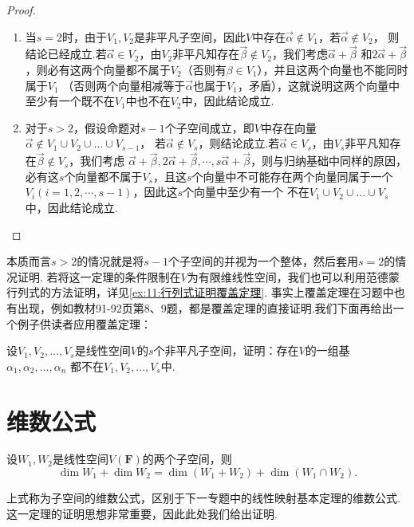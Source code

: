 \begin{proof}
    \begin{enumerate}
        \item 当$s=2$时，由于$V_1,V_2$是非平凡子空间，因此$V$中存在$\vec{\alpha}\notin V_1$，若$\vec{\alpha}\notin V_2$，
        则结论已经成立.若$\vec{\alpha}\in V_2$，由$V_2$非平凡知存在$\vec{\beta}\notin V_2$，我们考虑$\vec{\alpha}+\vec{\beta}$
        和$2\vec{\alpha}+\vec{\beta}$，则必有这两个向量都不属于$V_2$（否则有$\beta\in V_1$），并且这两个向量也不能同时属于$V_1$
        （否则两个向量相减等于$\vec{\alpha}$也属于$V_1$，矛盾），这就说明这两个向量中至少有一个既不在$V_1$中也不在$V_2$中，因此结论成立.
        \item 对于$s>2$，假设命题对$s-1$个子空间成立，即$V$中存在向量$\vec{\alpha}\notin V_1\cup V_2\cup\ldots\cup V_{s-1}$，
        若$\vec{\alpha}\notin V_s$，则结论成立.若$\vec{\alpha}\in V_s$，由$V_s$非平凡知存在$\vec{\beta}\notin V_s$，我们考虑
        $\vec{\alpha}+\vec{\beta},2\vec{\alpha}+\vec{\beta},\cdots,s\vec{\alpha}+\vec{\beta}$，则与归纳基础中同样的原因，
        必有这$s$个向量都不属于$V_s$，且这$s$个向量中不可能存在两个向量同属于一个$V_i(i=1,2,\cdots,s-1)$，因此这$s$个向量中至少有一个
        不在$V_1\cup V_2\cup\ldots\cup V_s$中，因此结论成立.
    \end{enumerate}
\end{proof}

本质而言$s>2$的情况就是将$s-1$个子空间的并视为一个整体，然后套用$s=2$的情况证明.
若将这一定理的条件限制在$V$为有限维线性空间，我们也可以利用范德蒙行列式的方法证明，详见\autoref{ex:11:行列式证明覆盖定理}.
事实上覆盖定理在习题中也有出现，例如教材91-92页第8、9题，都是覆盖定理的直接证明.我们下面再给出一个例子供读者应用覆盖定理：
\begin{example}
    设$V_1,V_2,\ldots,V_s$是线性空间$V$的$s$个非平凡子空间，证明：存在$V$的一组基$\alpha_1,\alpha_2,\ldots,\alpha_n$
    都不在$V_1,V_2,\ldots,V_s$中.
\end{example}

\section{维数公式}
\begin{theorem}\label{thm:4:维数公式}
    设$W_1,W_2$是线性空间$V(\mathbf{F})$的两个子空间，则
    \[\dim W_1+\dim W_2=\dim(W_1+W_2)+\dim(W_1\cap W_2).\]
\end{theorem}
上式称为子空间的维数公式，区别于下一专题中的线性映射基本定理的维数公式.这一定理的证明思想非常重要，因此此处我们给出证明.

